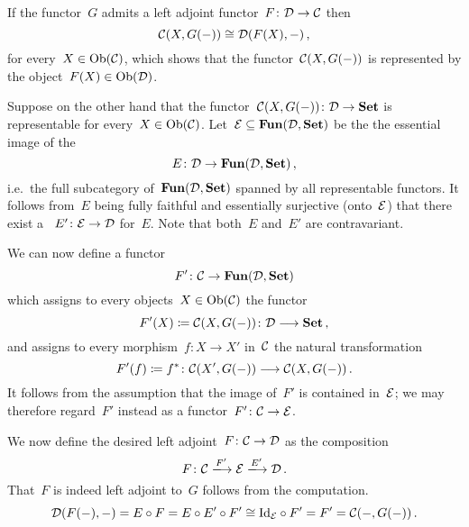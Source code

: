 \section{}

If the functor~$G$ admits a left adjoint functor~$F \colon \mathcal{D} \to \mathcal{C}$  then
\[
        \mathcal{C}(X, G(-))
  \cong \mathcal{D}(F(X), -) \,,
\]
for every~$X \in \operatorname{Ob}(\mathcal{C})$, which shows that the functor~$\mathcal{C}(X, G(-))$ is represented by the object~$F(X) \in \operatorname{Ob}(\mathcal{D})$.

Suppose on the other hand that the functor~$\mathcal{C}(X, G(-)) \colon \mathcal{D} \to \mathbf{Set}$ is representable for every~$X \in \operatorname{Ob}(\mathcal{C})$.
Let~$\mathcal{E} \subseteq \mathbf{Fun}(\mathcal{D}, \mathbf{Set})$ be the the essential image of the 
\[
          E
  \colon  \mathcal{D}
  \to     \mathbf{Fun}(\mathcal{D}, \mathbf{Set}) \,,
\]
i.e.\ the full subcategory of~$\mathbf{Fun}(\mathcal{D}, \mathbf{Set})$ spanned by all representable functors.
It follows from~$E$ being fully faithful and essentially surjective (onto~$\mathcal{E}$) that there exist a ~$E' \colon \mathcal{E} \to \mathcal{D}$ for~$E$.
Note that both~$E$ and~$E'$ are contravariant.

We can now define a functor
\[
          F'
  \colon  \mathcal{C}
  \to     \mathbf{Fun}(\mathcal{D}, \mathbf{Set})
\]
which assigns to every objects~$X \in \operatorname{Ob}(\mathcal{C})$ the functor
\[
            F'(X)
  \coloneqq  \mathcal{C}(X, G(-))
  \colon    \mathcal{D}
  \longrightarrow   \mathbf{Set} \,,
\]
and assigns to every morphism~$f \colon X \to X'$ in~$\mathcal{C}$ the natural transformation
\[
            F'(f)
  \coloneqq  f^*
  \colon    \mathcal{C}(X', G(-))
  \longrightarrow   \mathcal{C}(X, G(-)) \,.
\]
It follows from the assumption that the image of~$F'$ is contained in~$\mathcal{E}$;
we may therefore regard~$F'$ instead as a functor~$F' \colon \mathcal{C} \to \mathcal{E}$.

We now define the desired left adjoint~$F \colon \mathcal{C} \to \mathcal{D}$ as the composition
\[
    F
  \colon
    \Ccat
  \xlongto{F'}
    \Ecat
  \xlongto{E'}
    \Dcat \,.
\]
That~$F$ is indeed left adjoint to~$G$ follows from the computation.
\[
        \mathcal{D}(F(-), -)
  =     E \circ F
  =     E \circ E' \circ F'
  \cong \mathrm{Id}_{\mathcal{E}} \circ F'
  =     F'
  =     \mathcal{C}(-, G(-)) \,.
\]




